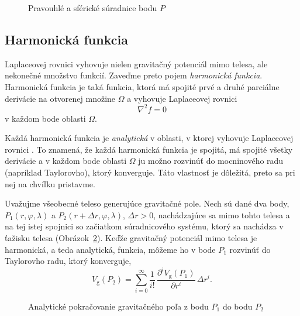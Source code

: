 \documentclass[a4paper, 12pt]{book}
\newcommand{\gidx}{\mathrm g}
\begin{document}
\begin{figure}
\centering

\caption{Pravouhlé a sférické súradnice bodu $P$}
\label{fig:cart_sph}
\end{figure}





\subsection{Harmonická funkcia}

Laplaceovej rovnici vyhovuje nielen gravitačný potenciál mimo telesa, ale 
nekonečné množstvo funkcií.  Zaveďme preto pojem \emph{harmonická funkcia}.  
Harmonická funkcia je taká funkcia, ktorá má spojité prvé a druhé parciálne 
derivácie na otvorenej množine $\Omega$ a vyhovuje Laplaceovej rovnici
%
\begin{equation}
\nabla^2 f = 0
\end{equation}
%
v každom bode oblasti $\Omega$.

Každá harmonická funkcia je \emph{analytická} v oblasti, v ktorej vyhovuje 
Laplaceovej rovnici \citep{MoritzPhysicalGeodesy}.  To znamená, že každá 
harmonická funkcia je spojitá, má spojité všetky derivácie a v každom bode 
oblasti $\Omega$ ju možno rozvinúť do mocninového radu (napríklad Taylorovho), 
ktorý konverguje.  Táto vlastnosť je dôležitá, preto sa pri nej na chvíľku 
pristavme.

Uvažujme všeobecné teleso generujúce gravitačné pole.  Nech sú dané dva body, 
$P_1(r, \varphi, \lambda)$ a $P_2(r + \Delta r, \varphi, \lambda)$, $\Delta 
r > 0$, nachádzajúce sa mimo tohto telesa a na tej istej spojnici so začiatkom 
súradnicového systému, ktorý sa nachádza v ťažisku telesa 
(Obrázok~\ref{fig:analytical_continuation}).  Keďže gravitačný potenciál mimo 
telesa je harmonická, a teda analytická, funkcia, môžeme ho v bode $P_1$ 
rozvinúť do Taylorovho radu, ktorý konverguje,
%
\begin{equation}
\label{eq:vg_analytical_continuation}
V_\gidx(P_2) = \sum_{i = 0}^\infty \frac{1}{i!} \, \frac{\partial^i 
V_\gidx(P_1)}{\partial r^i} \, \Delta r^i{.}
\end{equation}

\begin{figure}
\centering

\caption{Analytické pokračovanie gravitačného poľa z bodu $P_1$ do bodu $P_2$}
\label{fig:analytical_continuation}
\end{figure}
\end{document}
